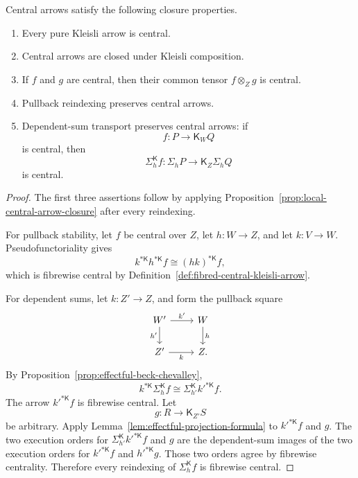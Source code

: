 \begin{proposition}
\label{prop:fibred-central-arrow-closure}
Central arrows satisfy the following closure properties.
\begin{enumerate}
    \item Every pure Kleisli arrow is central.

    \item Central arrows are closed under Kleisli composition.

    \item If \(f\) and \(g\) are central, then their common tensor
    \(f\otimes_Zg\) is central.

    \item Pullback reindexing preserves central arrows.

    \item Dependent-sum transport preserves central arrows: if
    \[
        f:P\to\mathsf K_WQ
    \]
    is central, then
    \[
        \Sigma_h^{\mathsf K}f:
        \Sigma_hP\to\mathsf K_Z\Sigma_hQ
    \]
    is central.
\end{enumerate}
\end{proposition}

\begin{proof}
The first three assertions follow by applying
Proposition~\ref{prop:local-central-arrow-closure} after every reindexing.

For pullback stability, let \(f\) be central over \(Z\), let \(h:W\to Z\),
and let \(k:V\to W\).  Pseudofunctoriality gives
\[
    k^{*\mathsf K}h^{*\mathsf K}f
    \cong
    (hk)^{*\mathsf K}f,
\]
which is fibrewise central by
Definition~\ref{def:fibred-central-kleisli-arrow}.

For dependent sums, let \(k:Z'\to Z\), and form the pullback square
\[
\begin{tikzcd}
    W'
        \arrow[r,"k'"]
        \arrow[d,"h'"']
    &
    W
        \arrow[d,"h"]
    \\
    Z'
        \arrow[r,"k"']
    &
    Z.
\end{tikzcd}
\]
By Proposition~\ref{prop:effectful-beck-chevalley},
\[
    k^{*\mathsf K}\Sigma_h^{\mathsf K}f
    \cong
    \Sigma_{h'}^{\mathsf K}k'^{*\mathsf K}f.
\]
The arrow \(k'^{*\mathsf K}f\) is fibrewise central.  Let
\[
    g:R\to\mathsf K_{Z'}S
\]
be arbitrary.  Apply
Lemma~\ref{lem:effectful-projection-formula} to
\(k'^{*\mathsf K}f\) and \(g\).  The two execution orders for
\(\Sigma_{h'}^{\mathsf K}k'^{*\mathsf K}f\) and \(g\) are the dependent-sum
images of the two execution orders for \(k'^{*\mathsf K}f\) and
\(h'^{*\mathsf K}g\).  Those two orders agree by fibrewise centrality.
Therefore every reindexing of \(\Sigma_h^{\mathsf K}f\) is fibrewise
central.
\end{proof}

